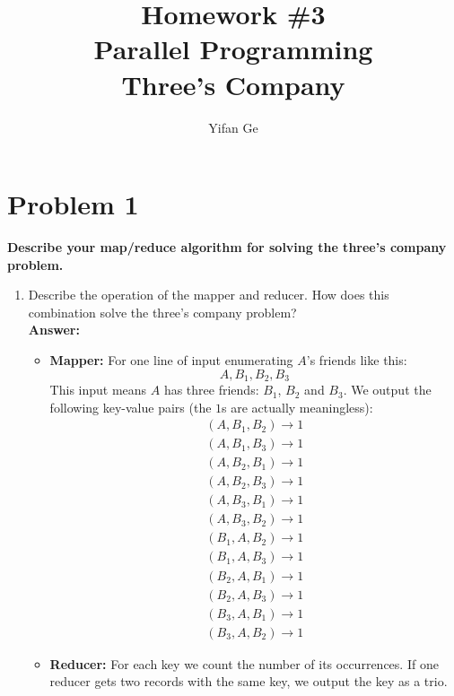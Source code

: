 \documentclass[letterpaper, 11pt]{article}
\begin{document}
\title{Homework \#3 \\ Parallel Programming \\Three's Company }
\author{Yifan Ge}

\maketitle
\section*{Problem 1}
\textbf{Describe your map/reduce algorithm for solving the three's company problem.}
\begin{enumerate}
    \item Describe the operation of the mapper and reducer. How does this combination solve the three's company problem?\\
    \textbf{Answer:} 
    \begin{itemize}
        \item \textbf{Mapper:} For one line of input enumerating $A$'s friends like this:\\
            $$A,B_1,B_2,B_3$$
            This input means $A$ has three friends: $B_1$, $B_2$ and $B_3$. We output the following key-value pairs (the $1$s are actually meaningless):\\
            \begin{align*}
            (A, B_1, B_2)\rightarrow 1\\
            (A, B_1, B_3)\rightarrow 1\\
            (A, B_2, B_1)\rightarrow 1\\
            (A, B_2, B_3)\rightarrow 1\\
            (A, B_3, B_1)\rightarrow 1\\
            (A, B_3, B_2)\rightarrow 1\\
            (B_1, A, B_2)\rightarrow 1\\
            (B_1, A, B_3)\rightarrow 1\\
            (B_2, A, B_1)\rightarrow 1\\
            (B_2, A, B_3)\rightarrow 1
            \end{align*}
            \begin{align*}
            (B_3, A, B_1)\rightarrow 1\\
            (B_3, A, B_2)\rightarrow 1
            \end{align*}
        \item \textbf{Reducer:} For each key we count the number of its occurrences. If one reducer gets two records with the same key, we output the key as a trio.\\

\end{itemize}
\end{enumerate}
\end{document}

